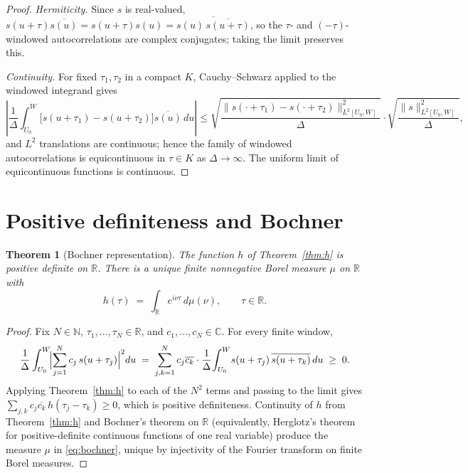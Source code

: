 \documentclass[11pt]{article}
\newtheorem{theorem}{Theorem}
\theoremstyle{definition}
\begin{document}
\begin{proof}
\emph{Hermiticity.} Since $s$ is real-valued,
$s(u+\tau)\overline{s(u)}=s(u+\tau)s(u)=\overline{s(u)\,\overline{s(u+\tau)}}$, so the
$\tau$- and $(-\tau)$-windowed autocorrelations are complex conjugates;
taking the limit preserves this.

\emph{Continuity.} For fixed $\tau_{1},\tau_{2}$ in a compact $K$,
Cauchy--Schwarz applied to the windowed integrand gives
\[
\left|\frac{1}{\Delta}\int_{U_{0}}^{W}\!\bigl[s(u+\tau_{1})-s(u+\tau_{2})\bigr]\overline{s(u)}\,du\right|
\le \sqrt{\frac{\|s(\cdot+\tau_{1})-s(\cdot+\tau_{2})\|_{L^{2}[U_{0},W]}^{2}}{\Delta}}\cdot
\sqrt{\frac{\|s\|_{L^{2}[U_{0},W]}^{2}}{\Delta}},
\]
and $L^{2}$ translations are continuous; hence the family of windowed
autocorrelations is equicontinuous in $\tau\in K$ as $\Delta\to\infty$.
The uniform limit of equicontinuous functions is continuous.
\end{proof}

\section{Positive definiteness and Bochner}\label{sec:bochner}

\begin{theorem}[Bochner representation]\label{thm:bochner}
The function $h$ of Theorem~\ref{thm:h} is positive definite on
$\mathbb{R}$. There is a unique finite nonnegative Borel measure $\mu$ on
$\mathbb{R}$ with
\begin{equation}\label{eq:bochner}
h(\tau) \;=\; \int_{\mathbb{R}}e^{i\nu\tau}\,d\mu(\nu),\qquad \tau\in\mathbb{R}.
\end{equation}
\end{theorem}

\begin{proof}
Fix $N\in\mathbb{N}$, $\tau_{1},\dots,\tau_{N}\in\mathbb{R}$, and
$c_{1},\dots,c_{N}\in\mathbb{C}$. For every finite window,
\begin{equation}\label{eq:pd}
\frac{1}{\Delta}\int_{U_{0}}^{W}\!\Bigl|\sum_{j=1}^{N}c_{j}\,s(u+\tau_{j})\Bigr|^{2}du
\;=\; \sum_{j,k=1}^{N}c_{j}\overline{c_{k}}\cdot\frac{1}{\Delta}\!\int_{U_{0}}^{W}\!
s(u+\tau_{j})\,\overline{s(u+\tau_{k})}\,du \;\ge\;0.
\end{equation}
Applying Theorem~\ref{thm:h} to each of the $N^{2}$ terms and passing to
the limit gives $\sum_{j,k}c_{j}\overline{c_{k}}\,h(\tau_{j}-\tau_{k})\ge 0$,
which is positive definiteness. Continuity of $h$ from Theorem~\ref{thm:h}
and Bochner's theorem on $\mathbb{R}$ (equivalently, Herglotz's theorem for
positive-definite continuous functions of one real variable) produce the
measure $\mu$ in \eqref{eq:bochner}, unique by injectivity of the Fourier
transform on finite Borel measures.
\end{proof}
\end{document}
